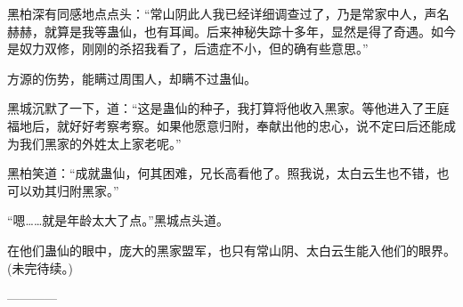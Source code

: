 \begin{this_body}
黑柏深有同感地点点头：“常山阴此人我已经详细调查过了，乃是常家中人，声名赫赫，就算是我等蛊仙，也有耳闻。后来神秘失踪十多年，显然是得了奇遇。如今是奴力双修，刚刚的杀招我看了，后遗症不小，但的确有些意思。”

方源的伤势，能瞒过周围人，却瞒不过蛊仙。

黑城沉默了一下，道：“这是蛊仙的种子，我打算将他收入黑家。等他进入了王庭福地后，就好好考察考察。如果他愿意归附，奉献出他的忠心，说不定曰后还能成为我们黑家的外姓太上家老呢。”

黑柏笑道：“成就蛊仙，何其困难，兄长高看他了。照我说，太白云生也不错，也可以劝其归附黑家。”

“嗯……就是年龄太大了点。”黑城点头道。

在他们蛊仙的眼中，庞大的黑家盟军，也只有常山阴、太白云生能入他们的眼界。(未完待续。)

------------

\end{this_body}

